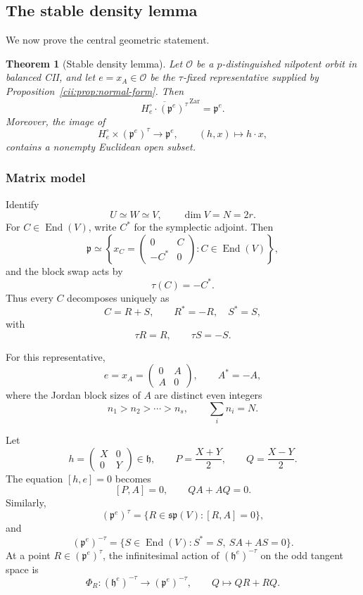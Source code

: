 \documentclass[10pt,a4paper]{amsart}
\numberwithin{equation}{section}
\newtheorem{theorem}{Theorem}[section]
\newcommand{\End}{\operatorname{End}}
\begin{document}
\subsection{The stable density lemma}

We now prove the central geometric statement.


\begin{theorem}[Stable density lemma]\label{cii:thm:stable-density}
Let \(\mathcal O\) be a \(p\)-distinguished nilpotent orbit in balanced
CII, and let \(e=x_A\in\mathcal O\) be the \(\tau\)-fixed representative
supplied by Proposition~\ref{cii:prop:normal-form}.  Then
\[
\overline{
H_e^\circ\cdot(\mathfrak p^e)^\tau
}^{\,\mathrm{Zar}}
=
\mathfrak p^e.
\]
Moreover, the image of
\[
H_e^\circ\times(\mathfrak p^e)^\tau\longrightarrow\mathfrak p^e,
\qquad
(h,x)\longmapsto h\cdot x,
\]
contains a nonempty Euclidean open subset.
\end{theorem}


\subsubsection{Matrix model}

Identify
\[
U\simeq W\simeq V,
\qquad
\dim V=N=2r.
\]
For \(C\in\End(V)\), write \(C^*\) for the symplectic adjoint.
Then
\[
\mathfrak p
\simeq
\left\{
x_C=
\begin{pmatrix}
0&C\\
-C^*&0
\end{pmatrix}
:C\in\End(V)
\right\},
\]
and the block swap acts by
\[
\tau(C)=-C^*.
\]
Thus every \(C\) decomposes uniquely as
\[
C=R+S,
\qquad
R^*=-R,\quad S^*=S,
\]
with
\[
\tau R=R,\qquad
\tau S=-S.
\]

For this representative,
\[
e=x_A=
\begin{pmatrix}
0&A\\
A&0
\end{pmatrix},
\qquad
A^*=-A,
\]
where the Jordan block sizes of \(A\) are distinct even integers
\[
n_1>n_2>\cdots>n_s,
\qquad
\sum_i n_i=N.
\]

Let
\[
h=
\begin{pmatrix}
X&0\\
0&Y
\end{pmatrix}\in\mathfrak h,
\qquad
P=\frac{X+Y}{2},
\qquad
Q=\frac{X-Y}{2}.
\]
The equation \([h,e]=0\) becomes
\[
[P,A]=0,
\qquad
QA+AQ=0.
\]
Similarly,
\[
(\mathfrak p^e)^\tau
=
\{R\in\mathfrak{sp}(V):[R,A]=0\},
\]
and
\[
(\mathfrak p^e)^{-\tau}
=
\{S\in\End(V):S^*=S,\ SA+AS=0\}.
\]
At a point \(R\in(\mathfrak p^e)^\tau\), the infinitesimal action of
\((\mathfrak h^e)^{-\tau}\) on the odd tangent space is
\[
\Phi_R:
(\mathfrak h^e)^{-\tau}
\longrightarrow
(\mathfrak p^e)^{-\tau},
\qquad
Q\longmapsto QR+RQ.
\]
\end{document}
